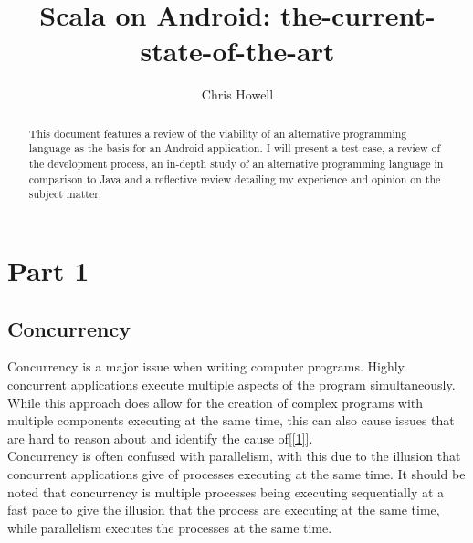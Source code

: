 \documentclass[11pt]{article}  %
\title{Scala on Android: the-current-state-of-the-art}
\author{Chris Howell\\}
\theoremstyle{definition}
\theoremstyle{remark}
\begin{document}
\maketitle
 \begin{center}
 
  \end{center}
\newpage                     %
\begin{abstract}

This document features a review of the viability of an alternative programming language as the basis for an Android application. I will present a test case, a review of the development process, an in-depth study of an alternative programming language in comparison to Java and a reflective review detailing my experience and opinion on the subject matter. 


\end{abstract}

\newpage                     %
\tableofcontents

\newpage                     %
\section{Part 1}\label{s:intro}
%


 \begin{center}
  \end{center}

\subsection{Concurrency}\label{ss:back}



Concurrency is a major issue when writing computer programs. Highly concurrent applications execute multiple aspects of the program simultaneously. While this approach does allow for the creation of complex programs with multiple components executing at the same time, this can also cause issues that are hard to reason about and identify the cause of[\ref{1}].\\

Concurrency is often confused with parallelism, with this due to the illusion that concurrent applications give of processes executing at the same time. It should be noted that concurrency is multiple processes being executing sequentially at a fast pace to give the illusion that the process are executing at the same time, while parallelism executes the processes at the same time.\\
\end{document}
